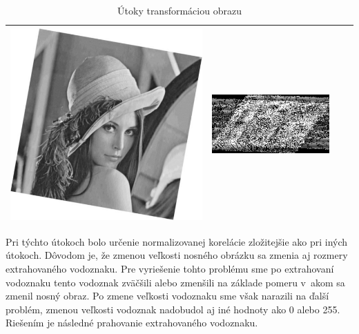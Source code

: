 \begin{table}[h]
\begin{tabular}{llcc}
\begin{minipage}[c]{.1\textwidth}
  \includegraphics[scale=0.1]{obrazky/rotation10}
\end{minipage}
 &
 \begin{minipage}[c]{.15\textwidth}
   \includegraphics[scale=0.25]{obrazky/rotation10-wm}
 \end{minipage} \\ \hline
\end{tabular}
\caption{Útoky transformáciou obrazu}
\end{table}

Pri týchto útokoch bolo určenie normalizovanej korelácie zložitejšie ako pri iných útokoch. Dôvodom je, že zmenou veľkosti nosného obrázku sa zmenia aj rozmery extrahovaného vodoznaku. Pre vyriešenie tohto problému sme po extrahovaní vodoznaku tento vodoznak zväčšili alebo zmenšili na základe pomeru v~akom sa zmenil nosný obraz. Po zmene veľkosti vodoznaku sme však narazili na ďalší problém, zmenou veľkosti vodoznak nadobudol aj iné hodnoty ako 0 alebo 255. Riešením je následné prahovanie extrahovaného vodoznaku.

